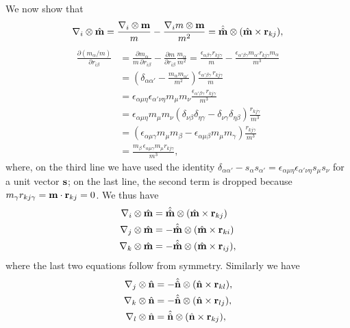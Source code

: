 \documentclass{article}
\begin{document}
We now show that
\begin{equation*}
\nabla_i \otimes \hat{\mathbf{m}}   
= \frac{ \nabla_i \otimes \mathbf{m}   } {m}
- \frac{ \nabla_i m \otimes \mathbf{m} } {m^2}   
= \hat{\hat{\mathbf{m}}} \otimes (\hat{\mathbf{m}} \times \mathbf{r}_{kj}),
\end{equation*}
%
\begin{equation*}
\begin{split}
  \frac {\partial (m_{\alpha} / m)} {\partial r_{i \beta} } 
  &=
  \frac {\partial m_{\alpha}} {m \, \partial r_{i \beta} } 
  -
  \frac {\partial m} {\partial r_{i \beta}} 
  \frac {m_\alpha} {m^2}
  =
  \frac{ \epsilon_{\alpha \beta \gamma} r_{kj \gamma} } { m }
  - \frac{ \epsilon_{\alpha' \beta \gamma} m_{\alpha'} r_{k j \gamma} m_\alpha }
    { m^3 } \\ 
  &= 
  \left( 
       \delta_{\alpha \alpha'} 
       - \frac{ m_\alpha m_{\alpha'} }{ m^2 } 
  \right)  
  \frac{\epsilon_{\alpha' \beta \gamma} \, r_{kj \gamma} } {m} \\
  &=
   \epsilon_{\alpha \mu \eta} \epsilon_{\alpha' \nu \eta}
   m_\mu m_\nu
  \frac{\epsilon_{\alpha' \beta \gamma} \, r_{kj \gamma} } {m^3} \\
  &=
  \epsilon_{\alpha \mu \eta}   m_\mu m_\nu
  (\delta_{\nu \beta} \delta_{\eta \gamma} - 
   \delta_{\nu \gamma} \delta_{\eta \beta})
  \frac{ r_{kj \gamma} } {m^3} \\
  &=
  (\epsilon_{\alpha \mu \gamma}   m_\mu m_\beta  - 
   \epsilon_{\alpha \mu \beta}   m_\mu m_\gamma )
  \frac{ r_{kj \gamma} } {m^3} \\
  &=
  \frac{m_\beta \, \epsilon_{\alpha \mu \gamma}  m_\mu  r_{kj \gamma}} {m^3},
\end{split}
\end{equation*}
%
where, on the third line we have used the identity 
$ \delta_{\alpha \alpha'} - s_\alpha s_{\alpha'} 
 = \epsilon_{\alpha \mu \eta} \epsilon_{\alpha' \nu \eta} s_\mu s_\nu $
for a unit vector $\mathbf{s}$; 
%
on the last line, the second term is dropped because 
$m_\gamma r_{kj \gamma}  = \mathbf{m} \cdot \mathbf{r}_{kj} = 0$.
%
%
%
We thus have
%
\begin{equation}
\begin{split}
\nabla_i \otimes \hat{\mathbf{m}}   &=  \hat{\hat{\mathbf{m}}} \otimes (\hat{\mathbf{m}} \times \mathbf{r}_{kj}) \\
\nabla_j \otimes \hat{\mathbf{m}}   &=  -\hat{\hat{\mathbf{m}}} \otimes (\hat{\mathbf{m}} \times \mathbf{r}_{ki}) \\
\nabla_k \otimes \hat{\mathbf{m}}   &=  -\hat{\hat{\mathbf{m}}} \otimes (\hat{\mathbf{m}} \times \mathbf{r}_{ij}),
\end{split}
\label{eq:dim1}
\end{equation}
where the last two equations follow from symmetry.  Similarly we have
%
%
\begin{equation}
\begin{split}
\nabla_j \otimes \hat{\mathbf{n}}   &=  -\hat{\hat{\mathbf{n}}} \otimes (\hat{\mathbf{n}} \times \mathbf{r}_{kl}), \\
\nabla_k \otimes \hat{\mathbf{n}}   &=  -\hat{\hat{\mathbf{n}}} \otimes (\hat{\mathbf{n}} \times \mathbf{r}_{lj}), \\
\nabla_l \otimes \hat{\mathbf{n}}   &=   \hat{\hat{\mathbf{n}}} \otimes (\hat{\mathbf{n}} \times \mathbf{r}_{kj}),
\end{split}
\end{equation}
\end{document}
